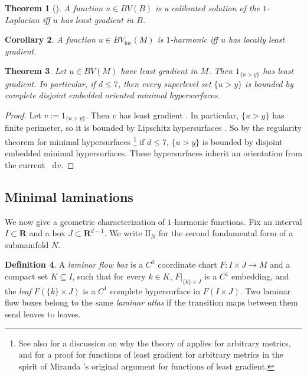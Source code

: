 \documentclass[reqno,11pt]{amsart}
\newcommand{\RR}{\mathbf{R}}
\newcommand*\dif{\mathop{}\!\mathrm{d}}
\newcommand{\Two}{\mathrm{I\!I}}
\newcommand{\dfn}[1]{\emph{#1}\index{#1}}
\newcommand{\loc}{\mathrm{loc}}
\newtheorem{theorem}{Theorem}[section]
\newtheorem{corollary}[theorem]{Corollary}
\theoremstyle{definition}
\newtheorem{definition}[theorem]{Definition}
\numberwithin{equation}{section}
\begin{document}
\begin{theorem}[{\cite[Theorem 1.1]{Mazon14}}]
A function $u \in BV(B)$ is a calibrated solution of the $1$-Laplacian iff $u$ has least gradient in $B$.
\end{theorem}

\begin{corollary}
A function $u \in BV_\loc(M)$ is $1$-harmonic iff $u$ has locally least gradient.
\end{corollary}

\begin{theorem}\label{main thm of old paper}
Let $u \in BV(M)$ have least gradient in $M$. Then $1_{\{u > y\}}$ has least gradient.
In particular, if $d \leq 7$, then every superlevel set $\{u > y\}$ is bounded by complete disjoint embedded oriented minimal hypersurfaces.
\end{theorem}
\begin{proof}
Let $v := 1_{\{u > y\}}$.
Then $v$ has least gradient \cite[Theorem 1]{BOMBIERI1969}.
In particular, $\{u > y\}$ has finite perimeter, so it is bounded by Lipschitz hypersurfaces \cite[Chapter 4]{Giusti77}.
So by the regularity theorem for minimal hypersurfaces \cite[\S37]{simon1983GMT}\footnote{See also \cite[Exercise 1.6]{DeLellis18} for a discussion on why the theory of \cite[\S37]{simon1983GMT} applies for arbitrary metrics, and \cite{BackusFLG} for a proof for functions of least gradient for arbitrary metrics in the spirit of Miranda \cite{Miranda66}'s original argument for functions of least gradient.} if $d \leq 7$, $\{u > y\}$ is bounded by disjoint embedded minimal hypersurfaces.
These hypersurfaces inherit an orientation from the current $\dif v$.
\end{proof}


\subsection{Minimal laminations}
We now give a geometric characterization of $1$-harmonic functions.
Fix an interval $I \subset \RR$ and a box $J \subset \RR^{d - 1}$.
We write $\Two_N$ for the second fundamental form of a submanifold $N$.

\begin{definition}
A \dfn{laminar flow box} is a $C^0$ coordinate chart $F: I \times J \to M$ and a compact set $K \subseteq I$, such that for every $k \in K$, $F|_{\{k\} \times J}$ is a $C^1$ embedding, and the \dfn{leaf} $F(\{k\} \times J)$ is a $C^1$ complete hypersurface in $F(I \times J)$.
Two laminar flow boxes belong to the same \dfn{laminar atlas} if the transition maps between them send leaves to leaves.
\end{definition}
\end{document}
